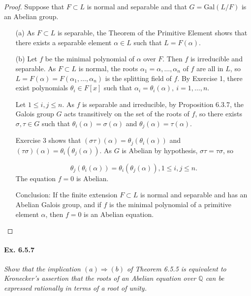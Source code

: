 \documentclass[11pt,a4paper]{article}
\newcommand{\Q}{\mathbb{Q}}
\newcommand{\Gal}{\mathrm{Gal}}
\begin{document}
\begin{proof}
Suppose that $F \subset L$ is normal and separable and that $G = \Gal(L/F)$ is an Abelian group.
\begin{enumerate}
\item[(a)]
As $F \subset L$ is separable, the Theorem of the Primitive Element shows that there exists a separable element $\alpha \in L$ such that $L=F(\alpha)$.

\item[(b)]
Let $f$ be the minimal polynomial of $\alpha$ over $F$. Then $f$ is irreducible and separable. As $F \subset L$ is normal, the roots $\alpha_1=\alpha,\ldots,\alpha_n$ of $f$ are all in $L$, so  $L = F(\alpha) = F(\alpha_1,\ldots,\alpha_n)$ is the splitting field of $f$. By Exercise 1, there exist polynomials $\theta_i\in F[x]$ such that $\alpha_i = \theta_i(\alpha),\ i= 1,\ldots,n$.

Let $1\leq i,j \leq n$. As $f$ is separable and irreducible, by Proposition 6.3.7, the Galois group $G$ acts transitively on the set of the roots of $f$, so there exists $\sigma, \tau \in G$ such that $\theta_i(\alpha) = \sigma(\alpha)$ and $\theta_j(\alpha) = \tau(\alpha)$.

Exercise 3 shows that $(\sigma \tau)(\alpha) = \theta_j(\theta_i(\alpha))$ and $(\tau \sigma)(\alpha) = \theta_i(\theta_j(\alpha))$. As $G$ is Abelian by hypothesis, $\sigma \tau = \tau \sigma$, so

$$ \theta_j(\theta_i(\alpha)) =  \theta_i(\theta_j(\alpha)), 1\leq i,j \leq n.$$
The equation $f=0$ is Abelian.

Conclusion: If the finite extension $F\subset L$ is normal and separable and has an Abelian Galois group, and if $f$ is the minimal polynomial of a primitive element $\alpha$, then $f=0$ is an Abelian equation.
\end{enumerate}
\end{proof}
\paragraph{Ex. 6.5.7}

{\it Show that the implication $(a) \Rightarrow (b)$ of Theorem 6.5.5 is equivalent to Kronecker's assertion that the roots of an Abelian equation over $\Q$ can be expressed rationally in terms of a root of unity.
}
\end{document}
